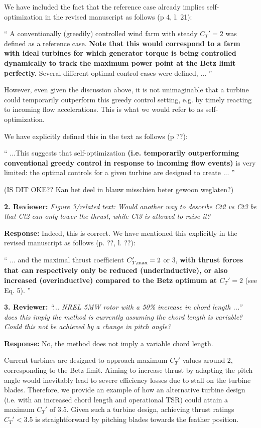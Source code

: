 \documentclass[]{article}
\begin{document}
We have included the fact that the reference case already implies self-optimization in the revised manuscript as follows (p 4, l. 21): 

``
A conventionally (greedily) controlled wind farm with steady $C_T' = 2$ was defined as a reference case. \textbf{Note that this would correspond to a farm with ideal turbines for which generator torque is being controlled dynamically to track the maximum power point at the Betz limit perfectly.} Several different optimal control cases were defined, ...
''

However, even given the discussion above, it is not unimaginable that a turbine could temporarily outperform this greedy control setting, e.g. by timely reacting to incoming flow accelerations. This is what we would refer to as self-optimization. {\color{blue} We have explicitly defined this in the text as follows (p ??):

``
...This suggests that self-optimization \textbf{(i.e. temporarily outperforming conventional greedy control in response to incoming flow events)} is very limited: the optimal controls for a given turbine are designed to create ...
'' }

(IS DIT OKE?? Kan het deel in blauw misschien beter gewoon weglaten?)


\dotfill

\textbf{2. Reviewer:} \textit{Figure 3/related text: Would another way to describe Ct2 vs Ct3 be that Ct2 can only lower the thrust, while Ct3 is allowed to raise it?}

\textbf{Response:} Indeed, this is correct. We have mentioned this explicitly in the revised manuscript as follows (p. ??, l. ??):

``
... and the maximal thrust coefficient $C_{T,\rm max}' = 2$ or 3, \textbf{with thrust forces that can respectively only be reduced (underinductive), or also increased (overinductive) compared to the Betz optimum at $C_T' = 2$} (see Eq. 5). 
''

\dotfill

\textbf{3. Reviewer:} \textit{``... NREL 5MW rotor with a 50\% increase in chord length ...'' does this imply the method is currently assuming the chord length is variable? Could this not be achieved by a change in pitch angle?}

\textbf{Response:} No, the method does not imply a variable chord length. 

Current turbines are designed to approach maximum $C_T'$ values around 2, corresponding to the Betz limit. Aiming to increase thrust by adapting the pitch angle would inevitably lead to severe efficiency losses due to stall on the turbine blades. Therefore, we provide an example of how an alternative turbine design (i.e. with an increased chord length and operational TSR) could attain a maximum $C_T'$ of 3.5. Given such a turbine design, achieving thrust ratings $C_T' < 3.5$ is straightforward by pitching blades towards the feather position. 
\end{document}
